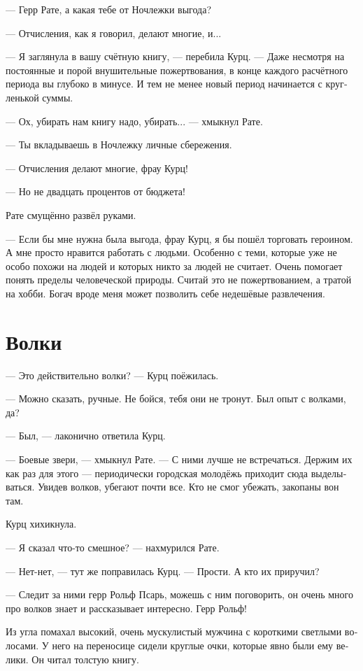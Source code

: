 \documentclass[a4paper,12pt,fleqn]{book}\usepackage{polyglossia}\setdefaultlanguage[babelshorthands=true]{russian}\setotherlanguage{english}\defaultfontfeatures{Ligatures=TeX,Mapping=tex-text}\usepackage{xcolor}\newcommand{\ml}[3]{#2}
\begin{document}
--- Герр Рате, а какая тебе от Ночлежки выгода?

--- Отчисления, как я говорил, делают многие, и...

--- Я заглянула в вашу счётную книгу, --- перебила Курц.
--- Даже несмотря на постоянные и порой внушительные пожертвования, в конце каждого расчётного периода вы глубоко в минусе.
И тем не менее новый период начинается с кругленькой суммы.

--- Ох, убирать нам книгу надо, убирать... --- хмыкнул Рате.

--- Ты вкладываешь в Ночлежку личные сбережения.

--- Отчисления делают многие, фрау Курц!

--- Но не двадцать процентов от бюджета!

Рате смущённо развёл руками.

--- Если бы мне нужна была выгода, фрау Курц, я бы пошёл торговать героином.
А мне просто нравится работать с людьми.
Особенно с теми, которые уже не особо похожи на людей и которых никто за людей не считает.
Очень помогает понять пределы человеческой природы.
Считай это не пожертвованием, а тратой на хобби.
Богач вроде меня может позволить себе недешёвые развлечения.

\section{Волки}

--- Это действительно волки? --- Курц поёжилась.

--- Можно сказать, ручные.
Не бойся, тебя они не тронут.
Был опыт с волками, да?

--- Был, --- лаконично ответила Курц.

--- Боевые звери, --- хмыкнул Рате.
--- С ними лучше не встречаться.
Держим их как раз для этого --- периодически городская молодёжь приходит сюда выделываться.
Увидев волков, убегают почти все.
Кто не смог убежать, закопаны вон там.

Курц хихикнула.

--- Я сказал что-то смешное? --- нахмурился Рате.

--- Нет-нет, --- тут же поправилась Курц.
--- Прости.
А кто их приручил?

--- Следит за ними герр Рольф Псарь, можешь с ним поговорить, он очень много про волков знает и рассказывает интересно.
Герр Рольф!

Из угла помахал высокий, очень мускулистый мужчина с короткими светлыми волосами.
У него на переносице сидели круглые очки, которые явно были ему велики.
Он читал толстую книгу.
\end{document}
